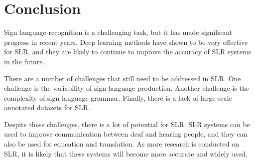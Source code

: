 \section{Conclusion}

Sign language recognition is a challenging task, but it has made significant progress in recent years. Deep learning methods have shown to be very effective for SLR, and they are likely to continue to improve the accuracy of SLR systems in the future.

There are a number of challenges that still need to be addressed in SLR. One challenge is the variability of sign language production. Another challenge is the complexity of sign language grammar. Finally, there is a lack of large-scale annotated datasets for SLR.

Despite these challenges, there is a lot of potential for SLR. SLR systems can be used to improve communication between deaf and hearing people, and they can also be used for education and translation. As more research is conducted on SLR, it is likely that these systems will become more accurate and widely used.
